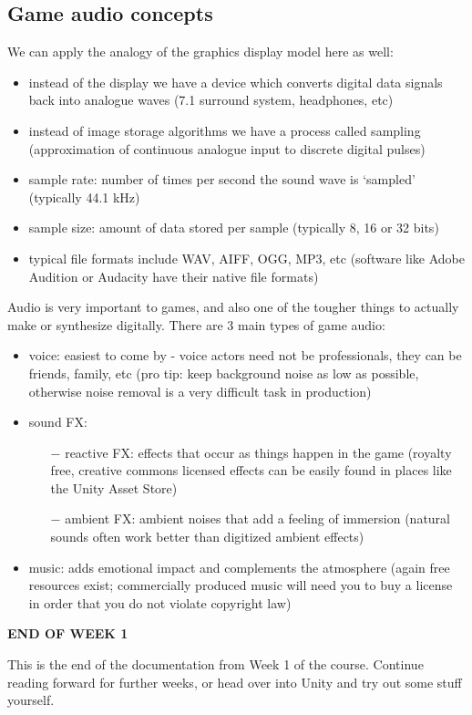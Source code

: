 \documentclass{article}[a4paper,12pt]
\theoremstyle{definition}
\begin{document}
\subsection{Game audio concepts}
We can apply the analogy of the graphics display model here as well:
\begin{itemize}
	\item instead of the display we have a device which converts digital data signals back into analogue waves (7.1 surround system, headphones, etc)
	\item instead of image storage algorithms we have a process called sampling (approximation of continuous analogue input to discrete digital pulses)
	\item sample rate: number of times per second the sound wave is `sampled' (typically 44.1 kHz)
	\item sample size: amount of data stored per sample (typically 8, 16 or 32 bits)
	\item typical file formats include WAV, AIFF, OGG, MP3, etc (software like Adobe Audition or Audacity have their native file formats)
\end{itemize}
Audio is very important to games, and also one of the tougher things to actually make or synthesize digitally. There are 3 main types of game audio:
\begin{itemize}
	\item voice: easiest to come by - voice actors need not be professionals, they can be friends, family, etc (pro tip: keep background noise as low as possible, otherwise noise removal is a very difficult task in production)
	\item sound FX:
	\begin{itemize}
		\item[$-$] reactive FX: effects that occur as things happen in the game (royalty free, creative commons licensed effects can be easily found in places like the Unity Asset Store)
		\item[$-$] ambient FX: ambient noises that add a feeling of immersion (natural sounds often work better than digitized ambient effects)
	\end{itemize}
	\item music: adds emotional impact and complements the atmosphere (again free resources exist; commercially produced music will need you to buy a license in order that you do not violate copyright law)
\end{itemize}
\hrulefill
\begin{center}\textbf{END OF WEEK 1}\end{center}
This is the end of the documentation from Week 1 of the course. Continue reading forward for further weeks, or head over into Unity and try out some stuff yourself.
\end{document}
